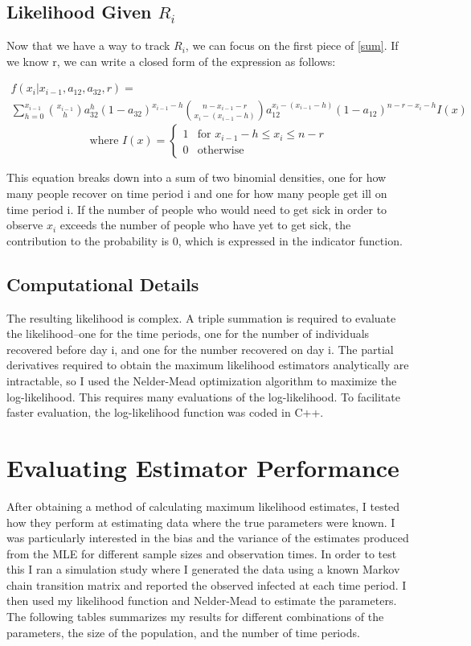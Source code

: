 \documentclass{svproc}
\begin{document}
\subsection*{Likelihood Given $R_i$}
Now that we have a way to track $R_i$, we can focus on the first piece of \eqref{sum}. If we know r, we can write a closed form of the expression as follows:

\begin{multline}
f(x_i|x_{i-1}, a_{12}, a_{32}, r) = \\ \sum_{h=0}^{x_{i-1}}       {{x_{i-1}}\choose{h}} a_{32}^h(1-a_{32})^{x_{i-1}-h}  {{n-x_{i-1}-r}\choose{x_i-(x_{i-1}-h)}}  a_{12}^{x_i-(x_{i-1}-h)} (1-a_{12})^{n - r - x_i-h}I(x)  \end{multline} $$
\text{where } I(x) = \begin{cases} 1 & \text{for } x_{i-1}-h\leq x_i\leq n-r  \\ 0 &\text{otherwise} \end{cases}$$

This equation breaks down into a sum of two binomial densities, one for how many people recover on time period i and one for how many people get ill on time period i. If the number of people who would need to get sick in order to observe $x_i$ exceeds the number of people who have yet to get sick, the contribution to the probability is 0, which is expressed in the indicator function.

\subsection*{Computational Details}
The resulting likelihood is complex. A triple summation is required to evaluate the likelihood--one for the time periods, one for the number of individuals recovered before day i, and one for the number recovered on day i. The partial derivatives required to obtain the maximum likelihood estimators analytically are intractable, so I used the Nelder-Mead optimization algorithm to maximize the log-likelihood. This requires many evaluations of the log-likelihood. To facilitate faster evaluation, the log-likelihood function was coded in C++.

\section{Evaluating Estimator Performance}
After obtaining a method of calculating maximum likelihood estimates, I tested how they perform at estimating data where the true parameters were known. I was particularly interested in the bias and the variance of the estimates produced from the MLE for different sample sizes and observation times. In order to test this I ran a simulation study where I generated the data using a known Markov chain transition matrix and reported the observed infected at each time period. I then used my likelihood function and Nelder-Mead to estimate the parameters. The following tables summarizes my results for different combinations of the parameters, the size of the population, and the number of time periods.
\end{document}
